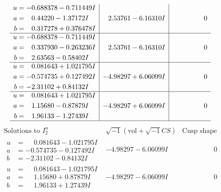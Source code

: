 \documentclass[1p]{elsarticle_modified}
\theoremstyle{definition}
\newcommand{\I}{\sqrt{-1}}
\begin{document}
$$\begin{array}{c|c|c}
\begin{aligned}
u &= -0.688378 - 0.711449 I \\
a &= \phantom{-}0.44220 - 1.37172 I \\
b &= \phantom{-}0.317278 + 0.376478 I\end{aligned}
 & \phantom{-}2.53761 - 6.16310 I & \phantom{-0.000000 } 0 \\ \hline\begin{aligned}
u &= -0.688378 - 0.711449 I \\
a &= \phantom{-}0.337930 - 0.263236 I \\
b &= \phantom{-}2.63563 - 0.58402 I\end{aligned}
 & \phantom{-}2.53761 - 6.16310 I & \phantom{-0.000000 } 0 \\ \hline\begin{aligned}
u &= \phantom{-}0.081643 + 1.021795 I \\
a &= -0.574735 + 0.127492 I \\
b &= -2.31102 + 0.84132 I\end{aligned}
 & -4.98297 + 6.06099 I & \phantom{-0.000000 } 0 \\ \hline\begin{aligned}
u &= \phantom{-}0.081643 + 1.021795 I \\
a &= \phantom{-}1.15680 - 0.87879 I \\
b &= \phantom{-}1.96133 - 1.27439 I\end{aligned}
 & -4.98297 + 6.06099 I & \phantom{-0.000000 } 0\\
 \hline 
 \end{array}$$\newpage$$\begin{array}{c|c|c}  
\text{Solutions to }I^u_{2}& \I (\text{vol} + \sqrt{-1}CS) & \text{Cusp shape}\\
 \hline 
\begin{aligned}
u &= \phantom{-}0.081643 - 1.021795 I \\
a &= -0.574735 - 0.127492 I \\
b &= -2.31102 - 0.84132 I\end{aligned}
 & -4.98297 - 6.06099 I & \phantom{-0.000000 } 0 \\ \hline\begin{aligned}
u &= \phantom{-}0.081643 - 1.021795 I \\
a &= \phantom{-}1.15680 + 0.87879 I \\
b &= \phantom{-}1.96133 + 1.27439 I\end{aligned}
 & -4.98297 - 6.06099 I & \phantom{-0.000000 } 0 \\ \hline\begin{aligned}

\end{aligned}
\end{array}$$
\end{document}
